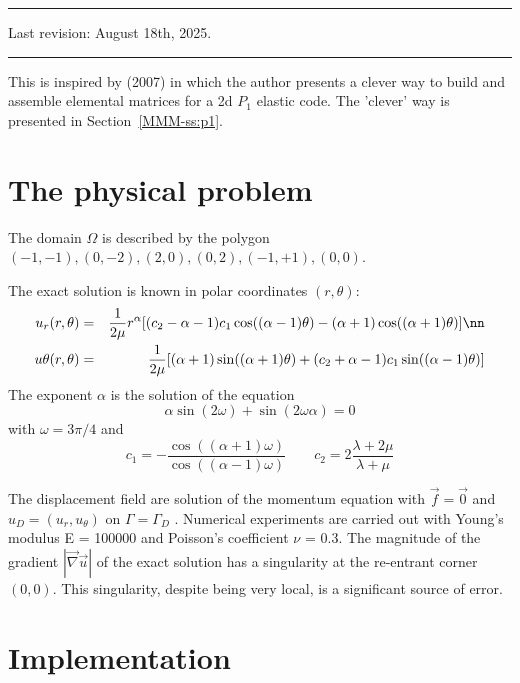 \par\noindent\rule{\textwidth}{0.4pt}

Last revision: August 18th, 2025.

\par\noindent\rule{\textwidth}{0.4pt}


This \stone is inspired by \textcite{koko07} (2007) in which the author presents 
a clever way to build and assemble elemental matrices for a 2d $P_1$ elastic code.
The 'clever' way is presented in Section~\ref{MMM-ss:p1}.

\section*{The physical problem}

The domain $\Omega$ is described by the polygon
$(-1,-1), (0,-2), (2, 0), (0, 2), (-1,+1), (0, 0)$.

The exact solution is known in polar coordinates $(r,\theta)$:
\begin{eqnarray}
u_r(r,\theta)
&=&\frac{1}{2\mu} r^\alpha 
[(c_2 - \alpha - 1)c_1 \cos((\alpha - 1)\theta) 
- (\alpha + 1) \cos((\alpha + 1)\theta)] \nn\\
u\theta(r,\theta)&=& 
\frac{1}{2\mu}
[(\alpha + 1) \sin((\alpha + 1)\theta) 
+ (c_2 + \alpha - 1)c_1 \sin((\alpha - 1)\theta)]
\end{eqnarray}
The exponent $\alpha$ is the solution of the equation
\[
\alpha \sin(2\omega) + \sin(2\omega \alpha ) = 0
\]
with $\omega=3\pi/4$ and
\[
c_1 = -\frac{\cos((\alpha+1)\omega)}{\cos((\alpha-1)\omega)}
\qquad
c_2 = 2 \frac{\lambda + 2\mu}{\lambda+\mu}
\]


The displacement field are solution of the momentum equation 
with $\vec{f} = \vec{0}$ and $u_D = (u_r , u_\theta )$ on 
$\Gamma = \Gamma_D$ . Numerical
experiments are carried out with Young’s modulus E = 100000 and Poisson’s coefficient $\nu$ = 0.3. The magnitude of
the gradient $|\vec\nabla \vec{u}|$ of the exact solution 
has a singularity at the re-entrant corner $(0,0)$. This singularity,
despite being very local, is a significant source of error.

\section*{Implementation}




